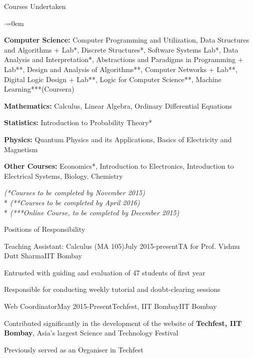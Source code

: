 \documentclass[a4paper,8pt]{resume}%
\begin{document}
\begin{rSection}{Courses Undertaken}
\begin{list}{$\cdot$}{\leftmargin=0em}
{
\item \textbf {Computer Science:} Computer Programming and Utilization, Data Structures and Algorithms + Lab*, Discrete Structures*, Software Systems Lab*, Data Analysis and Interpretation*, Abstractions and Paradigms in Programming + Lab**, Design and Analysis of Algorithms**, Computer Networks + Lab**, Digital Logic Design + Lab**, Logic for Computer Science**,  Machine Learning***(Coursera)
\item {\bf Mathematics:} Calculus, Linear Algebra, Ordinary Differential Equations
\item {\bf Statistics:} Introduction to Probability Theory*
\item {\bf Physics:} Quantum Physics and its Applications, Basics of Electricity and Magnetism
\item {\bf Other Courses:} Economics*, Introduction to Electronics, Introduction to Electrical Systems, Biology, Chemistry}
\end{list}
\footnotesize{
\hspace*{8cm}\textit{ (*Courses to be completed by November 2015)}\\*
\hspace*{8cm}\textit{ (**Courses to be completed by April 2016)}\\*
\hspace*{8cm}\textit{ (***Online Course, to be completed by December 2015)}\\
}
\end{rSection}

\begin{rSection}{Positions of Responsibility}
\begin{rSubsection}{Teaching Assistant: Calculus (MA 105)}{July 2015-present}{TA for Prof. Vishnu Dutt Sharma}{IIT Bombay}
{
\item Entrusted with guiding and evaluation of 47 students of first year
\item Responsible for conducting weekly tutorial and doubt-clearing sessions  
}\end{rSubsection}
\begin{rSubsection}{Web Coordinator}{May 2015-Present}{Techfest, IIT Bombay}{IIT Bombay}
{
\item Contributed significantly in the development of the website of \textbf{Techfest, IIT Bombay}, Asia's largest Science and Technology Festival
\item Previously served as an Organiser in Techfest
}\end{rSubsection}
\end{rSection}
\end{document}
